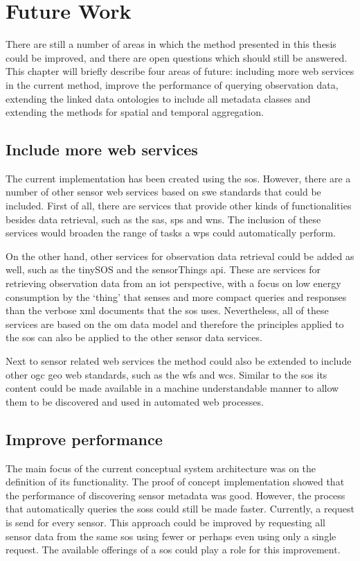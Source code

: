 
\chapter{Future Work}
\label{chap:futureResearch}

There are still a number of areas in which the method presented in this thesis could be improved, and there are open questions which should still be answered. This chapter will briefly describe four areas of future: including more web services in the current method, improve the performance of querying observation data, extending the linked data ontologies to include all metadata classes and extending the methods for spatial and temporal aggregation. 

\section{Include more web services}
The current implementation has been created using the \ac{sos}. However, there are a number of other sensor web services based on \ac{swe} standards that could be included. First of all, there are services that provide other kinds of functionalities besides data retrieval, such as the \acf{sas}, \acf{sps} and \acf{wns}. The inclusion of these services would broaden the range of tasks a \ac{wps} could automatically perform. 

On the other hand, other services for observation data retrieval could be added as well, such as the tinySOS and the sensorThings \ac{api}. These are services for retrieving observation data from an \ac{iot} perspective, with a focus on low energy consumption by the `thing' that senses and more compact queries and responses than the verbose \ac{xml} documents that the \ac{sos} uses. Nevertheless, all of these services are based on the \ac{om} data model and therefore the principles applied to the \ac{sos} can also be applied to the other sensor data services.  

Next to sensor related web services the method could also be extended to include other \ac{ogc} geo web standards, such as the \acf{wfs} and \acf{wcs}. Similar to the \ac{sos} its content could be made available in a machine understandable manner to allow them to be discovered and used in automated web processes.    

\section{Improve performance}
The main focus of the current conceptual system architecture was on the definition of its functionality. The proof of concept implementation showed that the performance of discovering sensor metadata was good. However, the process that automatically queries the \aclp{sos} could still be made faster. Currently, a request is send for every sensor. This approach could be improved by requesting all sensor data from the same \ac{sos} using fewer or perhaps even using only a single request. The available offerings of a \ac{sos} could play a role for this improvement.    

